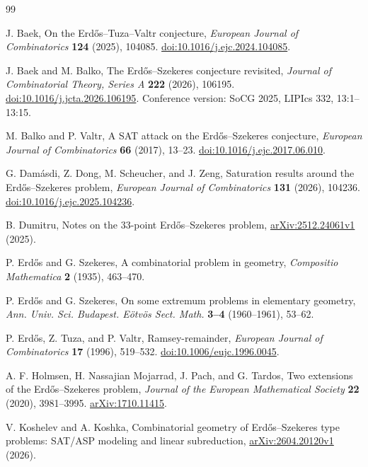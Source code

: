 \begin{thebibliography}{99}
\raggedright
{} J. Baek,
On the Erd\H{o}s--Tuza--Valtr conjecture,
\emph{European Journal of Combinatorics} \textbf{124} (2025), 104085.
\href{https://doi.org/10.1016/j.ejc.2024.104085}{doi:10.1016/j.ejc.2024.104085}.

 J. Baek and M. Balko,
The Erd\H{o}s--Szekeres conjecture revisited,
\emph{Journal of Combinatorial Theory, Series A} \textbf{222} (2026), 106195.
\href{https://doi.org/10.1016/j.jcta.2026.106195}{doi:10.1016/j.jcta.2026.106195}.
Conference version: SoCG 2025, LIPIcs 332, 13:1--13:15.

 M. Balko and P. Valtr,
A SAT attack on the Erd\H{o}s--Szekeres conjecture,
\emph{European Journal of Combinatorics} \textbf{66} (2017), 13--23.
\href{https://doi.org/10.1016/j.ejc.2017.06.010}{doi:10.1016/j.ejc.2017.06.010}.

 G. Dam\'asdi, Z. Dong, M. Scheucher, and J. Zeng,
Saturation results around the Erd\H{o}s--Szekeres problem,
\emph{European Journal of Combinatorics} \textbf{131} (2026), 104236.
\href{https://doi.org/10.1016/j.ejc.2025.104236}{doi:10.1016/j.ejc.2025.104236}.

 B. Dumitru,
Notes on the 33-point Erd\H{o}s--Szekeres problem,
\href{https://arxiv.org/abs/2512.24061}{arXiv:2512.24061v1} (2025).

 P. Erd\H{o}s and G. Szekeres,
A combinatorial problem in geometry,
\emph{Compositio Mathematica} \textbf{2} (1935), 463--470.

 P. Erd\H{o}s and G. Szekeres,
On some extremum problems in elementary geometry,
\emph{Ann. Univ. Sci. Budapest. E\"otv\"os Sect. Math.}
\textbf{3--4} (1960--1961), 53--62.

 P. Erd\H{o}s, Z. Tuza, and P. Valtr,
Ramsey-remainder,
\emph{European Journal of Combinatorics} \textbf{17} (1996), 519--532.
\href{https://doi.org/10.1006/eujc.1996.0045}{doi:10.1006/eujc.1996.0045}.

 A. F. Holmsen, H. Nassajian Mojarrad, J. Pach, and G. Tardos,
Two extensions of the Erd\H{o}s--Szekeres problem,
\emph{Journal of the European Mathematical Society} \textbf{22} (2020), 3981--3995.
\href{https://arxiv.org/abs/1710.11415}{arXiv:1710.11415}.

 V. Koshelev and A. Koshka,
Combinatorial geometry of Erd\H{o}s--Szekeres type problems:
SAT/ASP modeling and linear subreduction,
\href{https://arxiv.org/abs/2604.20120}{arXiv:2604.20120v1} (2026).


\end{thebibliography}
